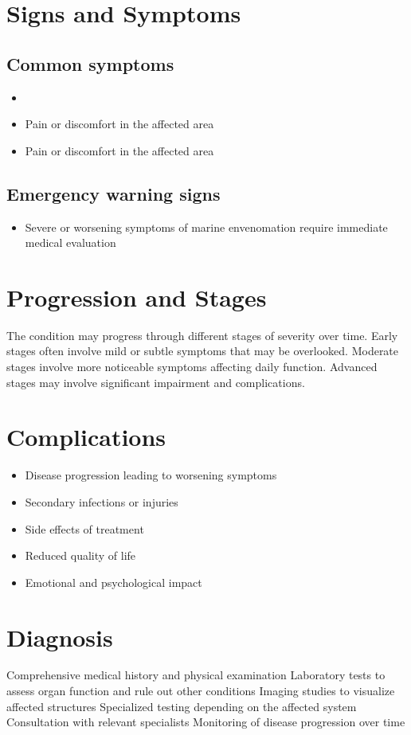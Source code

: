 \section{Signs and Symptoms}

\subsection{Common symptoms}
\begin{itemize}[noitemsep]
  \item \item Pain or discomfort in the affected area    \item Pain or discomfort in the affected area
  \end{itemize}

\subsection{Emergency warning signs}
\begin{itemize}[noitemsep]
  \item Severe or worsening symptoms of marine envenomation require immediate medical evaluation
\end{itemize}
\section{Progression and Stages}
The condition may progress through different stages of severity over time. Early stages often involve mild or subtle symptoms that may be overlooked. Moderate stages involve more noticeable symptoms affecting daily function. Advanced stages may involve significant impairment and complications.
\section{Complications}
\begin{itemize}[noitemsep]
  \item Disease progression leading to worsening symptoms
  \item Secondary infections or injuries
  \item Side effects of treatment
  \item Reduced quality of life
  \item Emotional and psychological impact
\end{itemize}
\section{Diagnosis}
Comprehensive medical history and physical examination Laboratory tests to assess organ function and rule out other conditions Imaging studies to visualize affected structures Specialized testing depending on the affected system Consultation with relevant specialists Monitoring of disease progression over time

